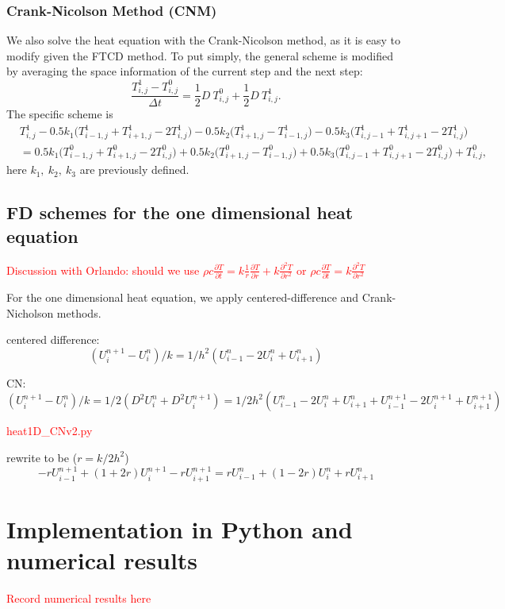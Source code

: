 \documentclass[12pt]{article}
\begin{document}
\subsubsection{Crank-Nicolson Method (CNM)}
We also solve the heat equation with the Crank-Nicolson method, as it is easy to modify given the FTCD method. To put simply, the general scheme is modified by averaging the space information of the current step and the next step:
\begin{equation}
\frac{T^1_{i,j}-T^0_{i,j}}{\Delta t}=\frac{1}{2}D\ T^0_{i,j}+\frac{1}{2}D\ T^1_{i,j}.
\end{equation}
The specific scheme is 
\begin{align}
& T^1_{i,j}-0.5k_1\bigg(T^1_{i-1,j}+T^1_{i+1,j}-2T^1_{i,j}\bigg)-0.5k_2\bigg(T^1_{i+1,j}-T^1_{i-1,j}\bigg)
-0.5k_3\bigg(T^1_{i,j-1}+T^1_{i,j+1}-2T^1_{i,j}\bigg)\nonumber\\
&= 0.5k_1\bigg(T^0_{i-1,j}+T^0_{i+1,j}-2T^0_{i,j}\bigg)+0.5k_2\bigg(T^0_{i+1,j}-T^0_{i-1,j}\bigg)
+0.5k_3\bigg(T^0_{i,j-1}+T^0_{i,j+1}-2T^0_{i,j}\bigg)+T^0_{i,j},
\end{align}
here $k_1,\ k_2,\ k_3$ are previously defined. 

\subsection{FD schemes for the one dimensional heat equation}

\textcolor{red}{Discussion with Orlando: should we use $\rho c\frac{\partial T}{\partial t}=k\frac{1}{r}\frac{\partial T}{\partial r}+k\frac{\partial^2T}{\partial r^2}$ or $\rho c\frac{\partial T}{\partial t}=k\frac{\partial^2T}{\partial r^2}$}

For the one dimensional heat equation, we apply centered-difference and Crank-Nicholson methods. 

centered difference:
$$(U^{n+1}_i - U^n_i)/k = 1/h^2 (U^n_{i-1} - 2U^n_i + U^n_{i+1})$$

CN:
$$(U^{n+1}_i - U^n_i)/k = 1/2 (D^2U^n_i + D^2U^{n+1}_i) 
=1/2h^2(U^n_{i-1} - 2U^n_i + U^n_{i+1} + U^{n+1}_{i-1} - 2U^{n+1}_i + U^{n+1}_{i+1})$$  

\textcolor{red}{heat1D\_CNv2.py} 

rewrite to be ($r=k/2h^2$)
$$-r U^{n+1}_{i-1} + (1+2r) U^{n+1}_i - r U^{n+1}_{i+1} = 
r U^n_{i-1} + (1-2r) U^n_i + r U^n_{i+1}$$

\section{Implementation in Python and numerical results}
\textcolor{red}{Record numerical results here}
\end{document}
